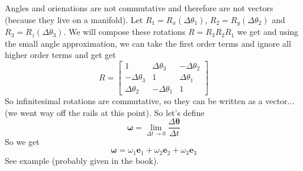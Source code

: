 \documentclass[a4paper]{article}
\begin{document}
Angles and orienations are not commutative and therefore are not vectors (because they live on a manifold). Let $R_1 = R_x( \Delta \theta_1)$, $R_2 = R_y(\Delta \theta_2)$ and $R_3 = R_z(\Delta \theta_3)$. We will compose these rotations $R = R_3R_2R_1$ we get and using the small angle approximation, we can take the first order terms and ignore all higher order terms and get get
\[
  R = 
  \begin{bmatrix}
    1 & \Delta \theta_3 & -\Delta \theta_2 \\
    -\Delta \theta_3 & 1 & \Delta \theta_1 \\
    \Delta \theta_2 & -\Delta \theta_1 & 1
  \end{bmatrix}
\]
So infinitesimal rotations are commutative, so they can be written as a vector... (we went way off the rails at this point). So let's define 
\[
\mathbf{\omega} = \lim_{\Delta t \rightarrow 0} \frac{\Delta \mathbf{\theta}}{\Delta t} 
\]
So we get
\[
  \mathbf{\omega} = \omega_1 \mathbf{e}_1 + \omega_2 \mathbf{e}_2 + \omega_3 \mathbf{e}_3
\]
See example (probably given in the book).
\end{document}

